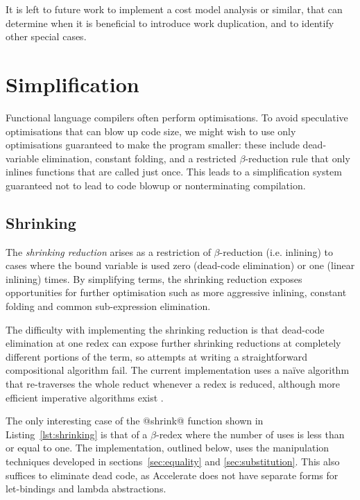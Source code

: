 It is left to future work to implement a cost model analysis or similar, that
can determine when it is beneficial to introduce work duplication, and to
identify other special cases.

\section{Simplification}
\label{sec:simplification}

Functional language compilers often perform optimisations. To avoid speculative
optimisations that can blow up code size, we might wish to use only
optimisations guaranteed to make the program smaller: these include
dead-variable elimination, constant folding, and a restricted $\beta$-reduction
rule that only inlines functions that are called just once. This leads to a
simplification system guaranteed not to lead to code blowup or nonterminating
compilation.

\subsection{Shrinking}
\label{sec:shrinking}

The \emph{shrinking reduction} arises as a restriction of $\beta$-reduction
(i.e. inlining) to cases where the bound variable is used zero (dead-code
elimination) or one (linear inlining) times. By simplifying terms,
the shrinking reduction exposes opportunities for further optimisation such as
more aggressive inlining, constant folding and common sub-expression
elimination. %

The difficulty with implementing the shrinking reduction is that dead-code
elimination at one redex can expose further shrinking reductions at completely
different portions of the term, so attempts at writing a straightforward
compositional algorithm fail. The current implementation uses a na\"ive
algorithm that re-traverses the whole reduct whenever a redex is reduced,
although more efficient imperative algorithms exist
\cite{Appel:1997gs,Benton:2004ua,Kennedy:2007cb}.

The only interesting case of the @shrink@ function shown in
Listing~\ref{lst:shrinking} is that of a
$\beta$-redex where the number of uses is less than or equal to one. The
implementation, outlined below, uses the  manipulation
techniques developed in sections~\ref{sec:equality} and \ref{sec:substitution}.
This also suffices to eliminate dead code, as Accelerate does not have separate
forms for let-bindings and lambda abstractions.

